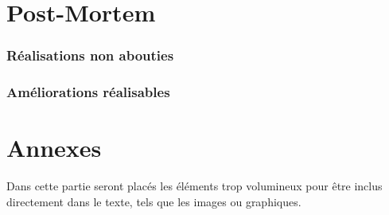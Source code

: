 \documentclass[a4paper]{article}
\newcommand{\alinea}{\hspace*{0.5cm}}
\begin{document}
	

  \newpage
  \part{Post-Mortem}
  
	\section{Réalisations non abouties}
	
	\section{Améliorations réalisables}
	

  \newpage
  \part{Annexes}
    \alinea Dans cette partie seront placés les éléments trop volumineux pour être inclus directement dans le texte, tels que les images ou graphiques.\\
    
\end{document}
